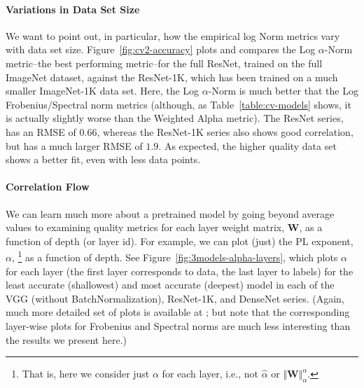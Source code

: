 \paragraph{Variations in Data Set Size}
We want to point out, in particular, how the empirical log Norm metrics vary with data set size.
Figure~\ref{fig:cv2-accuracy} plots and compares the 
Log $\alpha$-Norm
metric--the best performing metric--for the full ResNet, trained on the full ImageNet dataset, against the ResNet-1K, which has been trained on a much smaller ImageNet-1K data set.
Here, the Log $\alpha$-Norm is much better that the Log Frobenius/Spectral norm metrics (although, as Table~\ref{table:cv-models} shows, it is actually slightly worse than the Weighted Alpha metric).
The ResNet series, has an RMSE of $0.66$, whereas the ResNet-1K series also shows good correlation, but has a much larger RMSE of $1.9$.
As expected, the higher quality data set shows a better fit, even with less data points.

\paragraph{Correlation Flow}
We can learn much more about a pretrained model by going beyond average values to examining quality metrics for each layer weight matrix, $\mathbf{W}$, as a function of depth (or layer id).  %
For example, we can 
plot (just) the PL exponent, $\alpha$,%
\footnote{That is, here we consider just $\alpha$ for each layer, i.e., not $\hat{\alpha}$ or $\Vert\mathbf{W}\Vert^{\alpha}_{\alpha}$.} 
as a function of depth.
%
See Figure~\ref{fig:3models-alpha-layers}, which plots $\alpha$ for each layer (the first layer corresponds to data, the last layer to labels) for the least accurate (shallowest) and most accurate (deepest) model in each of the VGG (without BatchNormalization), ResNet-1K, and DenseNet series.
(Again, much more detailed set of plots is available at \cite{XXX-WEB-LINK}; but note that the corresponding layer-wise plots for Frobenius and Spectral norms are much less interesting than the results we present here.)

